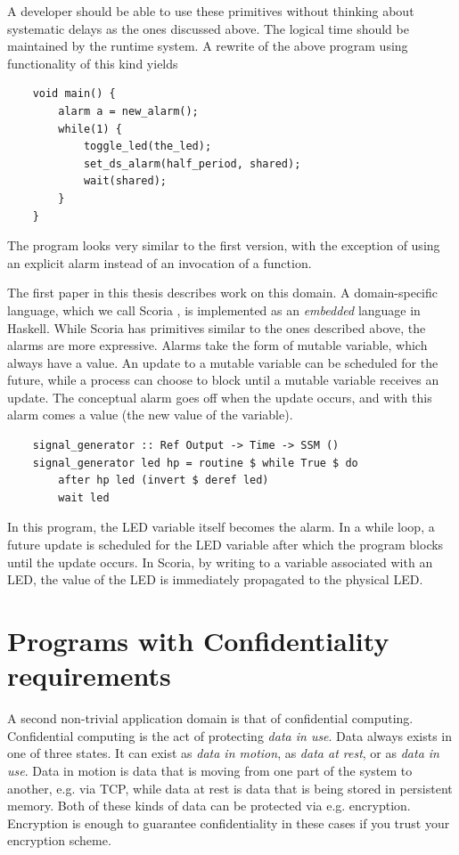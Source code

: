 A developer should be able to use these primitives without thinking about systematic delays as the ones discussed above.
The logical time should be maintained by the runtime system. A rewrite of the above program using functionality of this
kind yields

\begin{verbatim}
    void main() {
        alarm a = new_alarm();
        while(1) {
            toggle_led(the_led);
            set_ds_alarm(half_period, shared);
            wait(shared);
        }
    }
\end{verbatim}

The program looks very similar to the first version, with the exception of using an explicit alarm instead of an
invocation of a  function.

The first paper in this thesis describes work on this domain. A domain-specific language, which we call
Scoria \cite{DBLP:conf/memocode/KrookHSEC22}, is implemented as an \textit{embedded} language in Haskell. While Scoria
has primitives similar to the ones described above, the alarms are more expressive. Alarms take the form of mutable
variable, which always have a value. An update to a mutable variable can be scheduled for the future, while a process can
choose to block until a mutable variable receives an update. The conceptual alarm goes off when the update occurs, and with
this alarm comes a value (the new value of the variable).

\begin{verbatim}
    signal_generator :: Ref Output -> Time -> SSM ()
    signal_generator led hp = routine $ while True $ do
        after hp led (invert $ deref led)
        wait led
\end{verbatim}

In this program, the LED variable itself becomes the alarm. In a while loop, a future update is scheduled for the LED
variable after which the program blocks until the update occurs. In Scoria, by writing to a variable associated
with an LED, the value of the LED is immediately propagated to the physical LED.

\section{Programs with Confidentiality requirements}

A second non-trivial application domain is that of confidential computing. Confidential computing is the act of protecting
\textit{data in use}.
Data always exists in one of three states. It can exist as \textit{data in motion}, as \textit{data at rest}, or as
\textit{data in use}. Data in motion is data that is moving from one part of the system to another, e.g. via TCP, while data at rest
is data that is being stored in persistent memory. Both of these kinds of data can be protected via e.g. encryption.
Encryption is enough to guarantee confidentiality in these cases if you trust your encryption scheme.

